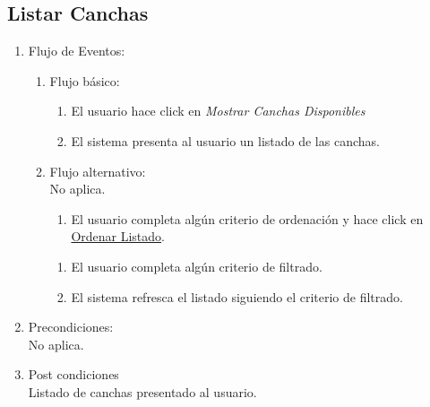 \documentclass[a4paper,11pt]{article}
\begin{document}
\subsection{Listar Canchas}
\begin{enumerate}


    \begin{enumerate}
    \item Descripción breve: \\
        Se le presenta al usuario un listado de las canchas cargadas en el sistema.
    \item Actores \\
        Usuario genérico.
    \item Disparadores: \\
        El usuario hace click en \emph{Mostrar canchas disponibles}.
    \end{enumerate}

    \item Flujo de Eventos: 

    \begin{enumerate}

        \item Flujo básico:
        \begin{enumerate}
                    \item El usuario hace click en \emph{Mostrar Canchas Disponibles}
                    \item El sistema presenta al usuario un listado de las canchas.
        \end{enumerate}
        \item Flujo alternativo:\\
			No aplica.
        \begin{enumerate}
                    \item El usuario completa algún criterio de ordenación y
                        hace click en \underline{Ordenar Listado}.
        \end{enumerate}
        \begin{enumerate}
                \item El usuario completa algún criterio de filtrado.
                \item El sistema refresca el listado siguiendo el criterio de filtrado.
        \end{enumerate}
    \end{enumerate}

    \item Precondiciones: \\
        No aplica.

    \item Post condiciones \\
        Listado de canchas presentado al usuario.

\end{enumerate}
\end{document}

